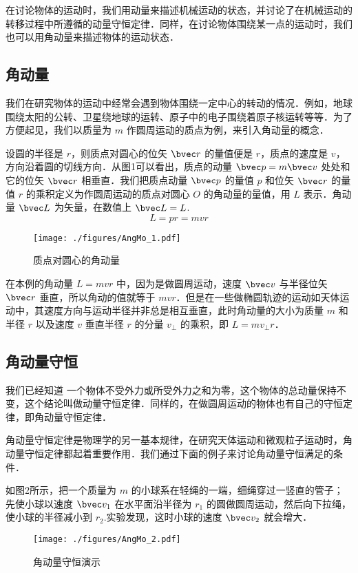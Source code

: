 
\begin{issues}
\issueTODO
\end{issues}

在讨论物体的运动时，我们用动量来描述机械运动的状态，并讨论了在机械运动的转移过程中所遵循的动量守恒定律．同样，在讨论物体围绕某一点的运动时，我们也可以用角动量来描述物体的运动状态．
\subsection{角动量}
我们在研究物体的运动中经常会遇到物体围绕一定中心的转动的情况．例如，地球围绕太阳的公转、卫星绕地球的运转、原子中的电子围绕着原子核运转等等．为了方便起见，我们以质量为 $m$ 作圆周运动的质点为例，来引入角动量的概念．

设圆的半径是 $r$，则质点对圆心的位矢 $\bvec r$ 的量值便是 $r$，质点的速度是 $v$，方向沿着圆的切线方向．从图1可以看出，质点的动量 $\bvec p = m\bvec v$ 处处和它的位矢 $\bvec r$ 相垂直．我们把质点动量 $\bvec p$ 的量值 $p$ 和位矢 $\bvec r$ 的量值 $r$ 的乘积定义为作圆周运动的质点对圆心 $O$ 的角动量的量值，用 $L$ 表示．角动量 $\bvec L$ 为矢量，在数值上 $\bvec L = L$.
\begin{equation}
L = pr = mvr
\end{equation}
\begin{figure}[ht]
\centering
\texttt{[image: ./figures/AngMo\_1.pdf]}
\caption{质点对圆心的角动量} \label{AngMo_fig1}
\end{figure}

在本例的角动量 $L=mvr$ 中，因为是做圆周运动，速度 $\bvec v$ 与半径位矢 $\bvec r$ 垂直，所以角动的值就等于 $mvr$．但是在一些做椭圆轨迹的运动如天体运动中，其速度方向与运动半径并非总是相互垂直，此时角动量的大小为质量 $m$ 和半径 $r$ 以及速度 $v$ 垂直半径 $r$ 的分量 $v_{\perp}$ 的乘积，即 $L=m v_{\perp}r$．
\subsection{角动量守恒}
我们已经知道 一个物体不受外力或所受外力之和为零，这个物体的总动量保持不变，这个结论叫做动量守恒定律．同样的，在做圆周运动的物体也有自己的守恒定律，即角动量守恒定律．

角动量守恒定律是物理学的另一基本规律，在研究天体运动和微观粒子运动时，角动量守恒定律都起着重要作用．我们通过下面的例子来讨论角动量守恒满足的条件．

如图2所示，把一个质量为 $m$ 的小球系在轻绳的一端，细绳穿过一竖直的管子；先使小球以速度 $\bvec v_1$ 在水平面沿半径为 $r_1$ 的圆做圆周运动，然后向下拉绳，使小球的半径减小到 $r_2$.实验发现，这时小球的速度 $\bvec v_2$ 就会增大．
\begin{figure}[ht]
\centering
\texttt{[image: ./figures/AngMo\_2.pdf]}
\caption{角动量守恒演示} \label{AngMo_fig2}
\end{figure}

